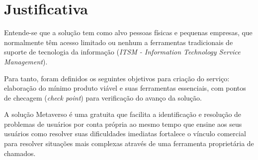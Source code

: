	\section[Justificativa]{Justificativa}
	
			
		Entende-se que a solução tem como alvo pessoas físicas e pequenas empresas, que normalmente têm acesso limitado ou nenhum a ferramentas tradicionais de suporte de tecnologia da informação (\textit{ITSM - Information Technology Service Management}).
			
		Para tanto, foram definidos os seguintes objetivos para criação do serviço: elaboração do mínimo produto viável e suas ferramentas essenciais, com pontos de checagem (\textit{check point}) para verificação do avanço da solução.
		
		A solução Metaverso é uma gratuita que facilita a identificação e resolução de problemas de usuários por conta própria ao mesmo tempo que ensine aos seus usuários como resolver suas dificuldades imediatas fortalece o vínculo comercial para resolver situações mais complexas através de uma ferramenta proprietária de chamados.
	

